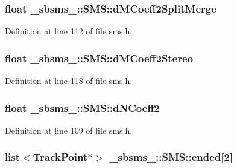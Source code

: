 \subsubsection[{\texorpdfstring{d\+M\+Coeff2\+Split\+Merge}{dMCoeff2SplitMerge}}]{\setlength{\rightskip}{0pt plus 5cm}float \+\_\+sbsms\+\_\+\+::\+S\+M\+S\+::d\+M\+Coeff2\+Split\+Merge\hspace{0.3cm}{\ttfamily [protected]}}\hypertarget{class__sbsms___1_1_s_m_s_a9054a322405cdc75aaa88f72a63b7f45}{}\label{class__sbsms___1_1_s_m_s_a9054a322405cdc75aaa88f72a63b7f45}


Definition at line 112 of file sms.\+h.

\subsubsection[{\texorpdfstring{d\+M\+Coeff2\+Stereo}{dMCoeff2Stereo}}]{\setlength{\rightskip}{0pt plus 5cm}float \+\_\+sbsms\+\_\+\+::\+S\+M\+S\+::d\+M\+Coeff2\+Stereo\hspace{0.3cm}{\ttfamily [protected]}}\hypertarget{class__sbsms___1_1_s_m_s_a76ac3e153905f281113328b1da1f8f89}{}\label{class__sbsms___1_1_s_m_s_a76ac3e153905f281113328b1da1f8f89}


Definition at line 118 of file sms.\+h.

\subsubsection[{\texorpdfstring{d\+N\+Coeff2}{dNCoeff2}}]{\setlength{\rightskip}{0pt plus 5cm}float \+\_\+sbsms\+\_\+\+::\+S\+M\+S\+::d\+N\+Coeff2\hspace{0.3cm}{\ttfamily [protected]}}\hypertarget{class__sbsms___1_1_s_m_s_a4689a6dba721b47b94e74bb01b54a737}{}\label{class__sbsms___1_1_s_m_s_a4689a6dba721b47b94e74bb01b54a737}


Definition at line 109 of file sms.\+h.

\subsubsection[{\texorpdfstring{ended}{ended}}]{\setlength{\rightskip}{0pt plus 5cm}list$<${\bf Track\+Point}$\ast$$>$ \+\_\+sbsms\+\_\+\+::\+S\+M\+S\+::ended\mbox{[}2\mbox{]}\hspace{0.3cm}{\ttfamily [protected]}}\hypertarget{class__sbsms___1_1_s_m_s_aaa44a7e8ffbd745e0d22a9d2baa3f1f7}{}\label{class__sbsms___1_1_s_m_s_aaa44a7e8ffbd745e0d22a9d2baa3f1f7}


